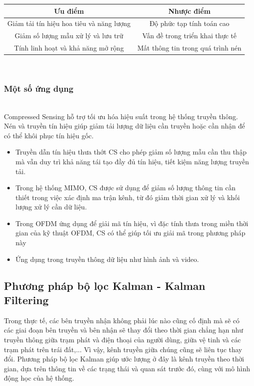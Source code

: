\documentclass{article}
\begin{document}
\begin{table}[h!]
\centering
\begin{tabular}{c|c}

\rowcolor{white} \textbf{Ưu điểm} & \textbf{Nhược điểm} \\ \hline
Giảm tải tín hiệu hoa tiêu và năng lượng & Độ phức tạp tính toán cao \\ 
Giảm số lượng mẫu xử lý và lưu trữ& Vấn đề trong triển khai thực tế \\  
Tính linh hoạt và khả năng mở rộng & Mất thông tin trong quá trình nén \\ 

\end{tabular}

\end{table}\\
\subsubsection{Một số ứng dụng}\\

Compressed Sensing hỗ trợ tối ưu hóa hiệu suất trong hệ thống truyền thông. Nén và truyền tín hiệu giúp giảm tải lượng dữ liệu cần truyền hoặc cần nhận để có thể khôi phục tín hiệu gốc.
\begin{itemize}
    \item Truyền dẫn tín hiệu thưa thớt CS cho phép giảm số lượng mẫu cần thu thập mà vẫn duy trì khả năng tái tạo đầy đủ tín hiệu, tiết kiệm năng lượng truyền tải.
    \item Trong hệ thống MIMO, CS được sử dụng để giảm số lượng thông tin cần thiết trong việc xác định ma trận kênh, từ đó giảm thời gian xử lý và khối lượng xử lý cần dữ liệu.
    \item Trong OFDM ứng dụng để giải mã tín hiệu, vì đặc tính thưa trong miền thời gian của kỹ thuật OFDM, CS có thể giúp tối ưu giải mã trong phương pháp này
    \item Ứng dụng trong truyền thông dữ liệu như hình ảnh và video.
\end{itemize}
\subsection{Phương pháp bộ lọc Kalman - Kalman Filtering}

Trong thực tế, các bên truyền nhận không phải lúc nào cũng cố định mà sẽ có các giai đoạn bên truyền và bên nhận sẽ thay đổi theo thời gian chẳng hạn như truyền thông giữa trạm phát và điện thoại của người dùng, giữa vệ tinh và các trạm phát trên trái đất,... Vì vậy, kênh truyền giữa chúng cũng sẽ liên tục thay đổi. Phương pháp bộ lọc Kalman giúp ước lượng ở đây là kênh truyền theo thời gian, dựa trên thông tin về các trạng thái và quan sát trước đó, cùng với mô hình động học của hệ thống.\\
\end{document}
